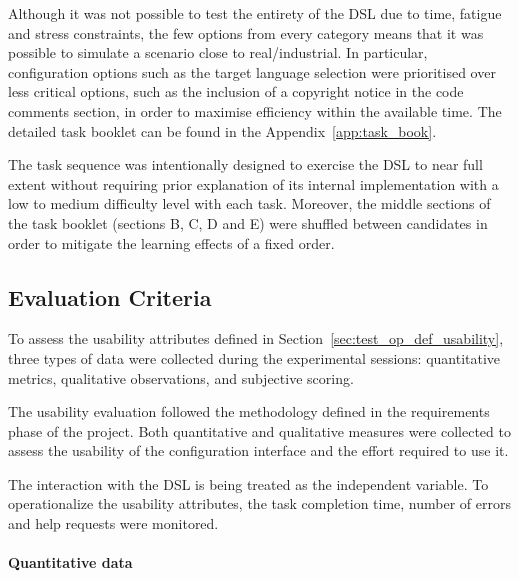 Although it was not possible to test the entirety of the \gls{DSL} due to time, fatigue and stress constraints, the few options from every category means that it was possible to simulate a scenario close to real/industrial. In particular, configuration options such as the target language selection were prioritised over less critical options, such as the inclusion of a copyright notice in the code comments section, in order to maximise efficiency within the available time. The detailed task booklet can be found in the Appendix~\ref{app:task_book}.

The task sequence was intentionally designed to exercise the \gls{DSL} to near full extent without requiring prior explanation of its internal implementation with a low to medium difficulty level with each task. Moreover, the middle sections of the task booklet (sections B, C, D and E) were shuffled between candidates in order to mitigate the learning effects of a fixed order.


\subsection{Evaluation Criteria}
\label{sec:test_usabl_eval_crit}

To assess the usability attributes defined in Section~\ref{sec:test_op_def_usability}, three types of data were collected during the experimental sessions: quantitative metrics, qualitative observations, and subjective scoring.

The usability evaluation followed the methodology defined in the requirements phase of the project. Both quantitative and qualitative measures were collected to assess the usability of the configuration interface and the effort required to use it.

The interaction with the \gls{DSL} is being treated as the independent variable. To operationalize the usability attributes, the task completion time, number of errors and help requests were monitored.

\paragraph{Quantitative data}
\label{sec:test_usabl_quant}

